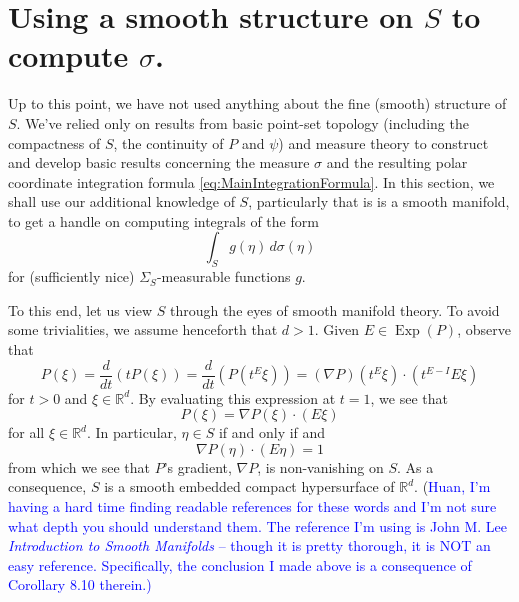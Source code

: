 \documentclass[11pt]{article}
\theoremstyle{theorem}
\newcommand\Exp{\operatorname{Exp}}
\begin{document}
\section{Using a smooth structure on $S$ to compute $\sigma$.}

Up to this point, we have not used anything about the fine (smooth) structure of $S$. We've relied only on results from basic point-set topology (including the compactness of $S$, the continuity of $P$ and $\psi$) and measure theory to construct and develop basic results concerning the measure $\sigma$ and the resulting polar coordinate integration formula \eqref{eq:MainIntegrationFormula}. In this section, we shall use our additional knowledge of $S$, particularly that is is a smooth manifold, to get a handle on computing integrals of the form
\begin{equation*}
\int_S g(\eta)\,d\sigma(\eta)
\end{equation*}
for (sufficiently nice) $\Sigma_S$-measurable functions $g$. 

To this end, let us view $S$ through the eyes of smooth manifold theory. To avoid some trivialities, we assume henceforth that $d>1$. Given $E\in\Exp(P)$, observe that
\begin{equation*}
P(\xi)=\frac{d}{dt}\left(tP(\xi)\right)=\frac{d}{dt}(P(t^E\xi))=\left(\nabla P\right)(t^E\xi)\cdot \left(t^{E-I}E\xi\right)
\end{equation*}
for $t>0$ and $\xi\in\mathbb{R}^d$. By evaluating this expression at $t=1$, we see that
\begin{equation*}
P(\xi)=\nabla P(\xi)\cdot(E\xi)
\end{equation*}
for all $\xi\in\mathbb{R}^d$. In particular, $\eta\in S$ if and only if  and 
\begin{equation*}
\nabla P(\eta)\cdot (E\eta)=1
\end{equation*}
from which we see that $P$'s gradient, $\nabla P$, is non-vanishing on $S$. As a consequence, $S$ is a smooth embedded compact hypersurface of $\mathbb{R}^d$. (\textcolor{blue}{Huan, I'm having a hard time finding readable references for these words and I'm not sure what depth you should understand them. The reference I'm using is John M. Lee \textit{Introduction to Smooth Manifolds} -- though it is pretty thorough, it is NOT an easy reference. Specifically, the conclusion I made above is a consequence of Corollary 8.10 therein.)} 
\end{document}
